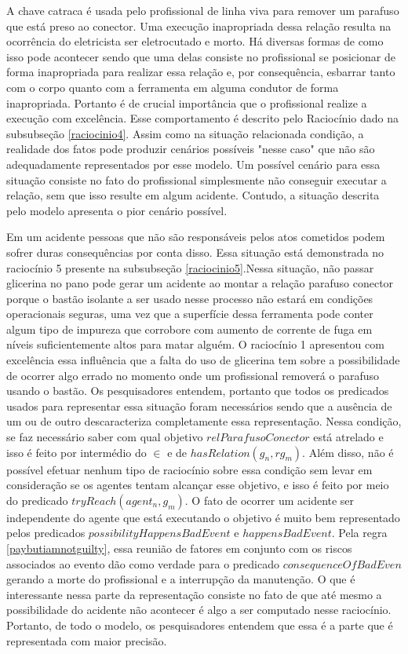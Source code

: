 A chave catraca é usada pelo profissional de linha viva para remover um parafuso que está preso ao conector. Uma execução inapropriada dessa relação resulta 
na ocorrência do eletricista ser eletrocutado e morto. Há diversas formas de como isso pode acontecer sendo que uma delas consiste no profissional se 
posicionar de forma inapropriada para realizar essa relação e, por consequência, esbarrar tanto com o corpo quanto com a ferramenta em alguma condutor 
de forma inapropriada. Portanto é de crucial importância que o profissional realize a execução com excelência. Esse comportamento é descrito pelo 
Raciocínio dado na subsubseção \ref{raciocinio4}. Assim como na situação relacionada condição, a realidade dos fatos pode produzir cenários possíveis "nesse caso" que não são 
adequadamente representados por esse modelo. Um possível cenário para essa situação consiste no fato do profissional simplesmente não conseguir executar 
a relação, sem que isso resulte em algum acidente. Contudo, a situação descrita pelo modelo apresenta o pior cenário possível. 

Em um acidente pessoas que não são responsáveis pelos atos cometidos podem sofrer duras consequências por conta disso. Essa situação está demonstrada no raciocínio 5 presente na subsubseção \ref{raciocinio5}.Nessa situação, não passar glicerina no pano pode gerar um acidente ao montar a relação parafuso conector porque o bastão isolante a ser usado nesse  processo não estará em condições operacionais seguras, uma vez que a superfície dessa ferramenta pode 
conter algum tipo de impureza que corrobore com aumento de corrente de fuga em níveis suficientemente altos para matar alguém. O raciocínio 1 apresentou
com excelência essa influência que a falta do uso de glicerina tem sobre a possibilidade de ocorrer algo errado no momento onde um profissional 
removerá o parafuso usando o bastão. Os pesquisadores entendem, portanto que todos os predicados usados para representar essa situação foram necessários 
sendo que a ausência de um ou de outro descaracteriza completamente essa representação. Nessa condição, se faz necessário saber com qual objetivo 
$relParafusoConector$ está atrelado e isso é feito por intermédio do $\in$ e de $hasRelation(g_n,rg_m)$. Além disso, não é possível efetuar nenhum 
tipo de raciocínio sobre essa condição sem levar em consideração se os agentes tentam alcançar esse objetivo, e isso é feito por meio do predicado 
$tryReach(agent_n,g_m)$. O fato de ocorrer um acidente ser independente do agente que está executando o objetivo é muito bem representado pelos predicados 
$possibilityHappensBadEvent$ e $happensBadEvent$. Pela regra \ref{paybutiamnotguilty}, essa reunião de fatores em conjunto com os riscos associados 
ao evento dão como verdade para o predicado $consequenceOfBadEven$ gerando a morte do profissional e a interrupção da manutenção. O que é interessante nessa parte da representação consiste no fato de que até mesmo a possibilidade do acidente não acontecer 
é algo a ser computado nesse raciocínio. Portanto, de todo o modelo, os pesquisadores entendem que essa é a parte que é representada com maior precisão. 

